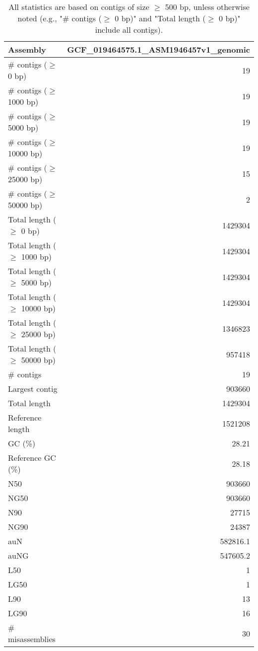 \documentclass[12pt,a4paper]{article}
\begin{document}
\begin{table}[ht]
\begin{center}
\caption{All statistics are based on contigs of size $\geq$ 500 bp, unless otherwise noted (e.g., "\# contigs ($\geq$ 0 bp)" and "Total length ($\geq$ 0 bp)" include all contigs).}
\begin{tabular}{|l*{1}{|r}|}
\hline
Assembly & GCF\_019464575.1\_ASM1946457v1\_genomic \\ \hline
\# contigs ($\geq$ 0 bp) & 19 \\ \hline
\# contigs ($\geq$ 1000 bp) & 19 \\ \hline
\# contigs ($\geq$ 5000 bp) & 19 \\ \hline
\# contigs ($\geq$ 10000 bp) & 19 \\ \hline
\# contigs ($\geq$ 25000 bp) & 15 \\ \hline
\# contigs ($\geq$ 50000 bp) & 2 \\ \hline
Total length ($\geq$ 0 bp) & 1429304 \\ \hline
Total length ($\geq$ 1000 bp) & 1429304 \\ \hline
Total length ($\geq$ 5000 bp) & 1429304 \\ \hline
Total length ($\geq$ 10000 bp) & 1429304 \\ \hline
Total length ($\geq$ 25000 bp) & 1346823 \\ \hline
Total length ($\geq$ 50000 bp) & 957418 \\ \hline
\# contigs & 19 \\ \hline
Largest contig & 903660 \\ \hline
Total length & 1429304 \\ \hline
Reference length & 1521208 \\ \hline
GC (\%) & 28.21 \\ \hline
Reference GC (\%) & 28.18 \\ \hline
N50 & 903660 \\ \hline
NG50 & 903660 \\ \hline
N90 & 27715 \\ \hline
NG90 & 24387 \\ \hline
auN & 582816.1 \\ \hline
auNG & 547605.2 \\ \hline
L50 & 1 \\ \hline
LG50 & 1 \\ \hline
L90 & 13 \\ \hline
LG90 & 16 \\ \hline
\# misassemblies & 30 \\ \hline

\end{tabular}
\end{center}
\end{table}
\end{document}
